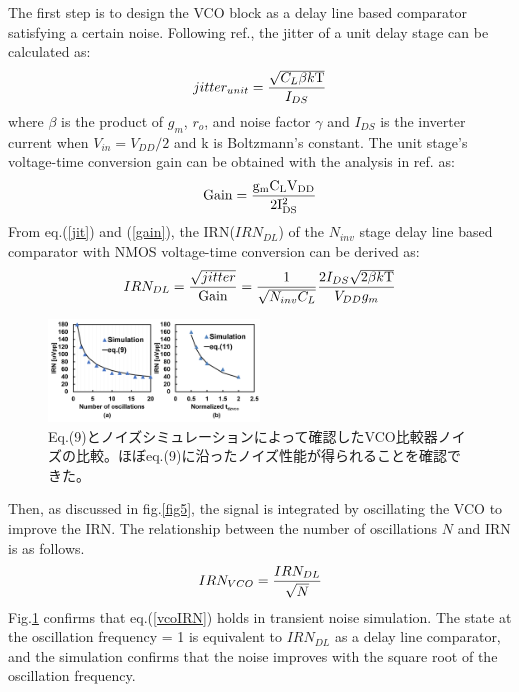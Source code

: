 \documentclass[letterpaper, 10 pt, conference]{ieeeconf}  %
\begin{document}
The first step is to design the VCO block as a delay line based comparator satisfying a certain noise.
Following ref.\cite{timecomp}, the jitter of a unit delay stage can be calculated as:
\begin{eqnarray}
    \centering
    jitter_{unit} = \frac{\sqrt{C_L\beta k \rm{T}}}{I_{DS}}
    \label{jit}
\end{eqnarray}
where $\beta$ is the product of $g_m$, $r_o$, and noise factor $\gamma$ and $I_{DS}$ is the inverter current when $V_{in} = V_{DD}/2$ and k is Boltzmann’s constant.
The unit stage's voltage-time conversion gain can be obtained with the analysis in ref.\cite{timecomp} as: 
\begin{eqnarray}
    \centering
    \rm{Gain} = \frac{g_mC_LV_{DD}}{2I_{DS}^2}
    \label{gain}
\end{eqnarray}
From eq.(\ref{jit}) and (\ref{gain}), the IRN($IRN_{DL}$) of the $N_{inv}$ stage delay line based comparator with NMOS voltage-time conversion can be derived as:
\begin{eqnarray}
    \centering
    IRN_{DL} = \frac{\sqrt{jitter}}{\rm{Gain}} = \frac{1}{\sqrt{N_{inv}C_L}}\frac{2I_{DS}\sqrt{2\beta k\rm{T}}}{V_{DD}g_m}
    \label{delaylineIRN}
\end{eqnarray}

\begin{figure}[ht!]
\centering
 \includegraphics[width=0.5\textwidth]{figs/analysis.png}
  \captionsetup{font=footnotesize}
  \caption{Eq.(9)とノイズシミュレーションによって確認したVCO比較器ノイズの比較。ほぼeq.(9)に沿ったノイズ性能が得られることを確認できた。}
  \label{nocnoise}
\end{figure}

Then, as discussed in fig.\ref{fig5}, the signal is integrated by oscillating the VCO to improve the IRN.
The relationship between the number of oscillations $N$ and IRN is as follows.
\begin{eqnarray}
    \centering
    IRN_{VCO} = \frac{IRN_{DL}}{\sqrt{N}}
    \label{vcoIRN}
\end{eqnarray}
Fig.\ref{nocnoise} confirms that eq.(\ref{vcoIRN}) holds in transient noise simulation. The state at the oscillation frequency = 1 is equivalent to $IRN_{DL}$ as a delay line comparator, and the simulation confirms that the noise improves with the square root of the oscillation frequency.
\end{document}
